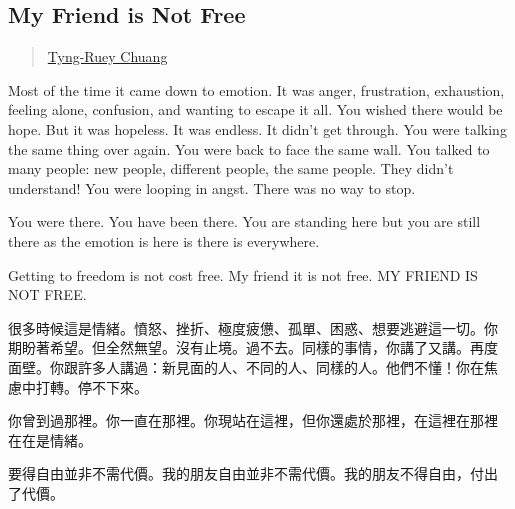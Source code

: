 \subsection{My Friend is Not Free}\label{my-friend-is-not-free}

\begin{quote}
\href{../appendix/attributions.html\#tyng-ruey-chuang}{Tyng-Ruey Chuang}
\end{quote}

Most of the time it came down to emotion. It was anger, frustration,
exhaustion, feeling alone, confusion, and wanting to escape it all. You
wished there would be hope. But it was hopeless. It was endless. It
didn't get through. You were talking the same thing over again. You were
back to face the same wall. You talked to many people: new people,
different people, the same people. They didn't understand! You were
looping in angst. There was no way to stop.

You were there. You have been there. You are standing here but you are
still there as the emotion is here is there is everywhere.

Getting to freedom is not cost free. My friend it is not free. MY FRIEND
IS NOT FREE.

很多時候這是情緒。憤怒、挫折、極度疲憊、孤單、困惑、想要逃避這一切。你
期盼著希望。但全然無望。沒有止境。過不去。同樣的事情，你講了又講。再度
面壁。你跟許多人講過：新見面的人、不同的人、同樣的人。他們不懂！你在焦
慮中打轉。停不下來。

你曾到過那裡。你一直在那裡。你現站在這裡，但你還處於那裡，在這裡在那裡
在在是情緒。

要得自由並非不需代價。我的朋友自由並非不需代價。我的朋友不得自由，付出
了代價。
